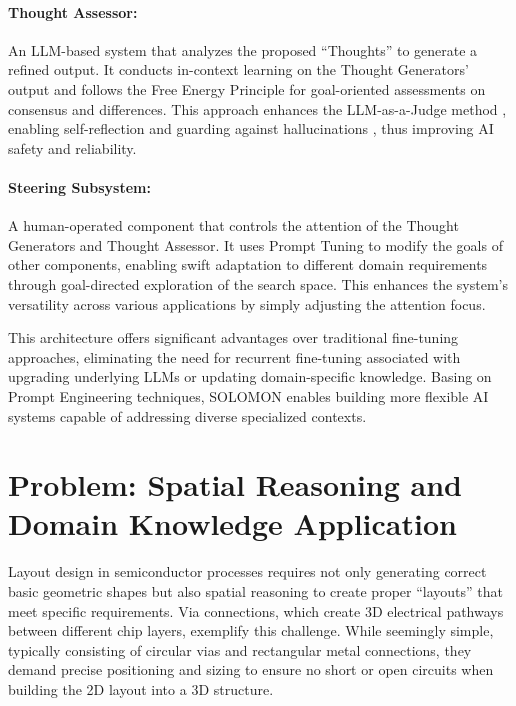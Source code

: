 \documentclass{article}
\begin{document}
\paragraph{Thought Assessor:} An LLM-based system that analyzes the proposed ``Thoughts'' to generate a refined output. It conducts in-context learning on the Thought Generators' output and follows the Free Energy Principle for goal-oriented assessments on consensus and differences. This approach enhances the LLM-as-a-Judge method \cite{zheng2023judgingllmasajudgemtbenchchatbot, lin2023llmevalunifiedmultidimensionalautomatic}, enabling self-reflection \cite{ji2023mitigatinghallucinationlargelanguage} and guarding against hallucinations \cite{guerreiro2023lookingneedlehaystackcomprehensive}, thus improving AI safety and reliability.

\paragraph{Steering Subsystem:} A human-operated component that controls the attention of the Thought Generators and Thought Assessor. It uses Prompt Tuning to modify the goals of other components, enabling swift adaptation to different domain requirements through goal-directed exploration of the search space. This enhances the system's versatility across various applications by simply adjusting the attention focus.

This architecture offers significant advantages over traditional fine-tuning approaches, eliminating the need for recurrent fine-tuning associated with upgrading underlying LLMs or updating domain-specific knowledge. Basing on Prompt Engineering techniques, SOLOMON enables building more flexible AI systems capable of addressing diverse specialized contexts.

\section{Problem: Spatial Reasoning and Domain Knowledge Application}
\label{sec:problem}
Layout design in semiconductor processes requires not only generating correct basic geometric shapes but also spatial reasoning to create proper ``layouts'' that meet specific requirements. Via connections, which create 3D electrical pathways between different chip layers, exemplify this challenge. While seemingly simple, typically consisting of circular vias and rectangular metal connections, they demand precise positioning and sizing to ensure no short or open circuits when building the 2D layout into a 3D structure.
\end{document}
